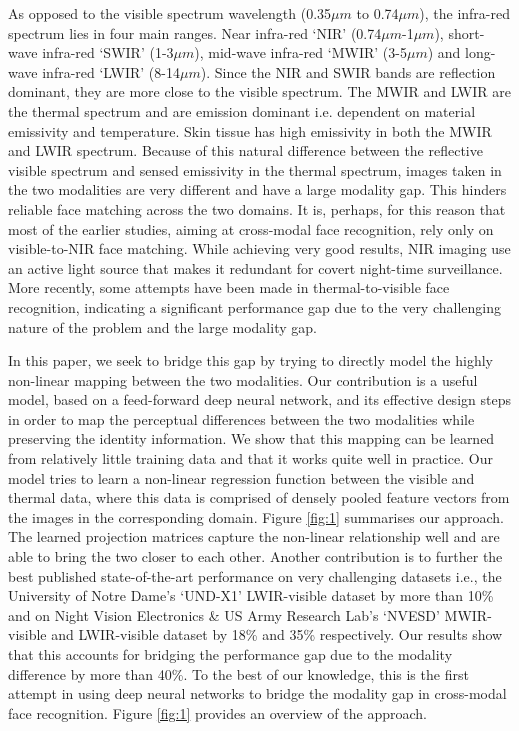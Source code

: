\documentclass[smallextended,natbib]{svjour3}       \usepackage{graphicx}
\begin{document}
As opposed to the visible spectrum wavelength (0.35$\mu m$ to 0.74$\mu m$), the infra-red spectrum lies in four main ranges. Near infra-red `NIR' (0.74$\mu m$-1$\mu m$), short-wave infra-red `SWIR' (1-3$\mu m$), mid-wave infra-red `MWIR' (3-5$\mu m$) and long-wave infra-red `LWIR' (8-14$\mu m$). Since the NIR and SWIR bands are reflection dominant, they are more close to the visible spectrum. The MWIR and LWIR are the thermal spectrum and are emission dominant i.e. dependent on material emissivity and temperature. Skin tissue has high emissivity in both the MWIR and LWIR spectrum. Because of this natural difference between the reflective visible spectrum and sensed emissivity in the thermal spectrum, images taken in the two modalities are very different and have a large modality gap. This hinders reliable face matching across the two domains. It is, perhaps, for this reason that most of the earlier studies, aiming at cross-modal face recognition, rely only on visible-to-NIR face matching. While achieving very good results, NIR imaging use an active light source that makes it redundant for covert night-time surveillance. More recently, some attempts have been made in thermal-to-visible face recognition, indicating a significant performance gap due to the very challenging nature of the problem and the large modality gap.

In this paper, we seek to bridge this gap by trying to directly model the highly non-linear mapping between the two modalities. Our contribution is a useful model, based on a feed-forward deep neural network, and its effective design steps in order to map the perceptual differences between the two modalities while preserving the identity information. We show that this mapping can be learned from relatively little training data and that it works quite well in practice. Our model tries to learn a non-linear regression function between the visible and thermal data, where this data is comprised of densely pooled feature vectors from the images in the corresponding domain. Figure \ref{fig:1} summarises our approach. The learned projection matrices capture the non-linear relationship well and are able to bring the two closer to each other. Another contribution is to further the best published state-of-the-art performance on very challenging datasets i.e., the University of Notre Dame's `UND-X1' LWIR-visible dataset by more than 10\% and on Night Vision Electronics \& US Army Research Lab's `NVESD' MWIR-visible and LWIR-visible dataset by 18\% and 35\% respectively. Our results show that this accounts for bridging the performance gap due to the modality difference by more than 40\%. To the best of our knowledge, this is the first attempt in using deep neural networks to bridge the modality gap in cross-modal face recognition. Figure \ref{fig:1} provides an overview of the approach. 
\end{document}
